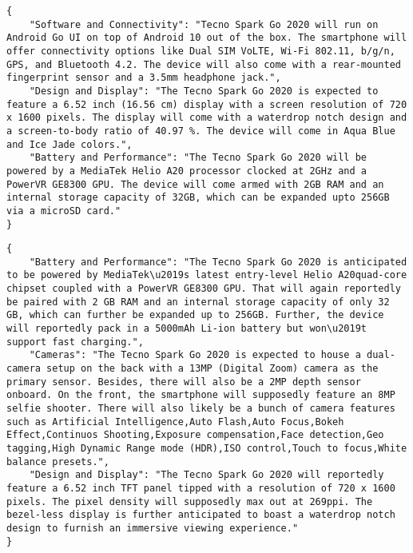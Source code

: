 \begin{figure*}
\begin{lstlisting}[style=reviews, frame = single, caption=Output generated with StructLM trained with eC-Tab2Text., label=code:JSON-StructLM]
{
    "Software and Connectivity": "Tecno Spark Go 2020 will run on Android Go UI on top of Android 10 out of the box. The smartphone will offer connectivity options like Dual SIM VoLTE, Wi-Fi 802.11, b/g/n, GPS, and Bluetooth 4.2. The device will also come with a rear-mounted fingerprint sensor and a 3.5mm headphone jack.",
    "Design and Display": "The Tecno Spark Go 2020 is expected to feature a 6.52 inch (16.56 cm) display with a screen resolution of 720 x 1600 pixels. The display will come with a waterdrop notch design and a screen-to-body ratio of 40.97 %. The device will come in Aqua Blue and Ice Jade colors.",
    "Battery and Performance": "The Tecno Spark Go 2020 will be powered by a MediaTek Helio A20 processor clocked at 2GHz and a PowerVR GE8300 GPU. The device will come armed with 2GB RAM and an internal storage capacity of 32GB, which can be expanded upto 256GB via a microSD card."
}
\end{lstlisting}
\end{figure*}


\begin{figure*}
\begin{lstlisting}[style=reviews, frame = single, caption=Output generated with Llama2 trained with eC-Tab2Text., label=code:JSON-Llama2]
{
    "Battery and Performance": "The Tecno Spark Go 2020 is anticipated to be powered by MediaTek\u2019s latest entry-level Helio A20quad-core chipset coupled with a PowerVR GE8300 GPU. That will again reportedly be paired with 2 GB RAM and an internal storage capacity of only 32 GB, which can further be expanded up to 256GB. Further, the device will reportedly pack in a 5000mAh Li-ion battery but won\u2019t support fast charging.",
    "Cameras": "The Tecno Spark Go 2020 is expected to house a dual-camera setup on the back with a 13MP (Digital Zoom) camera as the primary sensor. Besides, there will also be a 2MP depth sensor onboard. On the front, the smartphone will supposedly feature an 8MP selfie shooter. There will also likely be a bunch of camera features such as Artificial Intelligence,Auto Flash,Auto Focus,Bokeh Effect,Continuos Shooting,Exposure compensation,Face detection,Geo tagging,High Dynamic Range mode (HDR),ISO control,Touch to focus,White balance presets.",
    "Design and Display": "The Tecno Spark Go 2020 will reportedly feature a 6.52 inch TFT panel tipped with a resolution of 720 x 1600 pixels. The pixel density will supposedly max out at 269ppi. The bezel-less display is further anticipated to boast a waterdrop notch design to furnish an immersive viewing experience."
}
\end{lstlisting}
\end{figure*}
